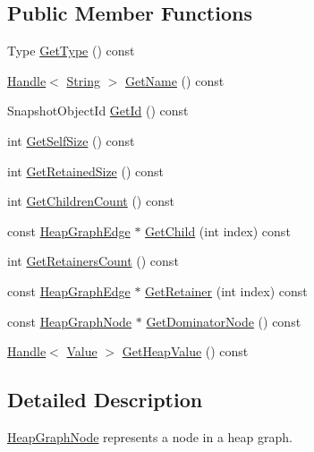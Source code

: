 \subsection*{Public Member Functions}
\begin{DoxyCompactItemize}
\item 
Type \hyperlink{classv8_1_1_heap_graph_node_a5e07fc855bded52229e62b855fa08c5d}{Get\+Type} () const 
\item 
\hyperlink{classv8_1_1_handle}{Handle}$<$ \hyperlink{classv8_1_1_string}{String} $>$ \hyperlink{classv8_1_1_heap_graph_node_af5f24ee6c07a57814e18bd317cb5576a}{Get\+Name} () const 
\item 
Snapshot\+Object\+Id \hyperlink{classv8_1_1_heap_graph_node_a0faf2a07888af9ca938b3ac089500b4c}{Get\+Id} () const 
\item 
int \hyperlink{classv8_1_1_heap_graph_node_acd3bd8860aa399ac56fa8a0229af7b85}{Get\+Self\+Size} () const 
\item 
int \hyperlink{classv8_1_1_heap_graph_node_a92482dde4fecae71759bfc5c2cfc4c43}{Get\+Retained\+Size} () const 
\item 
int \hyperlink{classv8_1_1_heap_graph_node_a0a49abe006755dd5536d15ae42f552d4}{Get\+Children\+Count} () const 
\item 
const \hyperlink{classv8_1_1_heap_graph_edge}{Heap\+Graph\+Edge} $\ast$ \hyperlink{classv8_1_1_heap_graph_node_ac3435611573e58b6614aeaab68442905}{Get\+Child} (int index) const 
\item 
int \hyperlink{classv8_1_1_heap_graph_node_a9de00d0733343b4b16823654813c22a1}{Get\+Retainers\+Count} () const 
\item 
const \hyperlink{classv8_1_1_heap_graph_edge}{Heap\+Graph\+Edge} $\ast$ \hyperlink{classv8_1_1_heap_graph_node_a260c115d00b7960a08ea34c6a8bee058}{Get\+Retainer} (int index) const 
\item 
const \hyperlink{classv8_1_1_heap_graph_node}{Heap\+Graph\+Node} $\ast$ \hyperlink{classv8_1_1_heap_graph_node_abdb4f9cb4fc89f5b65d3a499a6748fa7}{Get\+Dominator\+Node} () const 
\item 
\hyperlink{classv8_1_1_handle}{Handle}$<$ \hyperlink{classv8_1_1_value}{Value} $>$ \hyperlink{classv8_1_1_heap_graph_node_a721db273c266c30d7a79a40a212aeab5}{Get\+Heap\+Value} () const 
\end{DoxyCompactItemize}


\subsection{Detailed Description}
\hyperlink{classv8_1_1_heap_graph_node}{Heap\+Graph\+Node} represents a node in a heap graph. 

